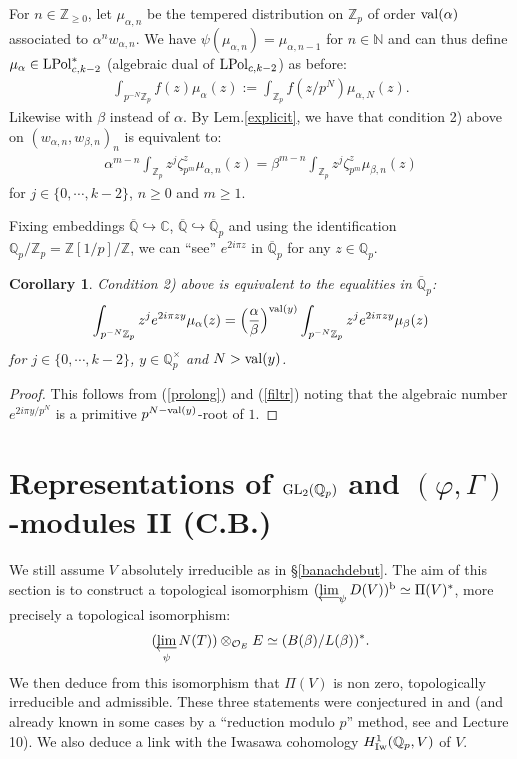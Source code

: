 \documentclass[11pt]{amsart}
\def\limproj{\mathop{\oalign{{\rm lim}\cr 
\hidewidth$\longleftarrow$\hidewidth\cr}}}
\def\Z{{\mathbb Z}_p}
\def\Q{{\mathbb Q}_p}
\def\G{{\rm GL}_2(\Q)}
\def\O{{\mathcal O}_E}
\newtheorem{cor}[definit]{\bf{Corollary}}
\begin{document}
For $n\in {\mathbb Z}_{\geq 0}$, let $\mu_{\alpha,n}$ be the tempered
distribution on $\Z$ of order ${\rm val}(\alpha)$ associated to
$\alpha^nw_{\alpha,n}$. We have
$\psi(\mu_{\alpha,n})=\mu_{\alpha,n-1}$ for $n\in {\mathbb N}$ and can
thus define ${\mu}_{\alpha}\in {\rm LPol}_{c,k-2}^*$ (algebraic dual
of ${\rm LPol}_{c,k-2}$) as before:  
\begin{eqnarray}\label{prolong} 
\int_{p^{-N}\Z}f(z)\mu_{\alpha}(z):=\int_{\Z}f(z/p^N)\mu_{\alpha,N}(z). 
\end{eqnarray} 
Likewise with $\beta$ instead of $\alpha$. By Lem.\ref{explicit}, we
have that condition 2) above on $(w_{\alpha,n},w_{\beta,n})_n$ is
equivalent to:  
\begin{eqnarray}\label{filtr} 
\alpha^{m-n}\int_{\Z}z^j\zeta_{p^m}^z\mu_{\alpha,n}(z)
=\beta^{m-n}\int_{\Z}z^j\zeta_{p^m}^z\mu_{\beta,n}(z)  
\end{eqnarray} 
for $j\in \{0,\cdots,k-2\}$, $n\geq 0$ and $m\geq 1$. 
 
Fixing embeddings $\overline{\mathbb Q}\hookrightarrow {\mathbb C}$,
$\overline{\mathbb Q}\hookrightarrow \overline\Q$ and using the
identification $\Q/\Z={\mathbb Z}[1/p]/{\mathbb Z}$, we can ``see''
$e^{2i\pi z}$ in $\overline\Q$ for any $z\in \Q$.  
 
\begin{cor}\label{equival} 
Condition 2) above is equivalent to the equalities in $\overline\Q$: 
$$\int_{p^{-N}\Z}z^je^{2i\pi
  zy}\mu_{\alpha}(z)=\Big(\frac{\alpha}{\beta}\Big)^{{\rm
    val}(y)}\int_{p^{-N}\Z}z^je^{2i\pi zy}\mu_{\beta}(z)$$  
for $j\in \{0,\cdots,k-2\}$, $y\in \Q^{\times}$ and $N>{\rm val}(y)$. 
\end{cor} 
\begin{proof} 
This follows from (\ref{prolong}) and (\ref{filtr}) noting that the
algebraic number $e^{2i\pi y/p^N}$ is a primitive $p^{N-{\rm
    val}(y)}$-root of $1$.  
\end{proof} 
 
 
\section{Representations of $\G$ and $(\varphi,\Gamma)$-mod\-ules II (C.B.)} 
 
We still assume $V$ absolutely irreducible as in
\S\ref{banachdebut}. The aim of this section is to construct a
topological isomorphism $(\limproj_{\psi}D(V))^{\rm b}\simeq\Pi(V)^*$,
more precisely a topological isomorphism:  
$$(\limproj_{\psi}N(T))\otimes_{\O}E\simeq (B(\beta)/L(\beta))^*.$$ 
We then deduce from this isomorphism that $\Pi(V)$ is non zero,
topologically irreducible and admissible. These three statements were
conjectured in \cite{Br2} and \cite{Br3} (and already known in some
cases by a ``reduction modulo $p$'' method, see \cite{Br2} and Lecture
10). We also deduce a link with the Iwasawa cohomology $H^1_{\rm
  Iw}(\Q,V)$ of $V$.   
 
\end{document}
